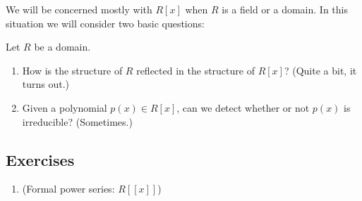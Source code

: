 \documentclass{article}
\begin{document}
We will be concerned mostly with $R[x]$ when $R$ is a field or a domain. In this situation we will consider two basic questions:

\begin{framed}
\noindent Let $R$ be a domain.
\begin{enumerate}
\item How is the structure of $R$ reflected in the structure of $R[x]$? (Quite a bit, it turns out.)
\item Given a polynomial $p(x) \in R[x]$, can we detect whether or not $p(x)$ is irreducible? (Sometimes.)
\end{enumerate}
\end{framed}

\subsection*{Exercises}

\begin{enumerate}
\item (Formal power series: $R[[x]]$)
\end{enumerate}
\end{document}
